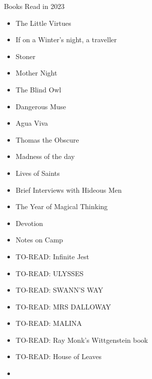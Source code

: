 Books Read in 2023
\begin{itemize}
    \item The Little Virtues
    \item If on a Winter's night, a traveller
    \item Stoner
    \item Mother Night
    \item The Blind Owl
    \item Dangerous Muse
    \item Agua Viva
    \item Thomas the Obscure
    \item Madness of the day
    \item Lives of Saints
    \item Brief Interviews with Hideous Men
    \item The Year of Magical Thinking
    \item Devotion
    \item Notes on Camp
    \item TO-READ: Infinite Jest
    \item TO-READ: ULYSSES
    \item TO-READ: SWANN'S WAY
    \item TO-READ: MRS DALLOWAY
    \item TO-READ: MALINA
    \item TO-READ: Ray Monk's Wittgenstein book
    \item TO-READ: House of Leaves
    \item 
\end{itemize}